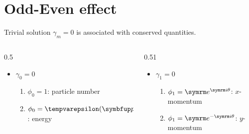\section{Odd-Even effect}

\begin{frame}{Trivial solution}
  \(\gamma_m = 0\) is associated with \alert{conserved quantities}.

  \begin{columns}
    \begin{column}{0.5\textwidth}
      \begin{itemize}
        \item \(\gamma_0 = 0\)
              \begin{enumerate}
                \item \(\phi_0 = 1\): particle number
                \item \(\phi_0 = \epsilon(\vv{p})\): energy
              \end{enumerate}
      \end{itemize}
    \end{column}
    \begin{column}{0.51\textwidth}
      \begin{itemize}
        \item \(\gamma_1 = 0\)
              \begin{enumerate}
                \item \(\phi_1 = \e^{\im \theta}\): \(x\)-momentum
                \item \(\phi_1 = \e^{-\im \theta}\): \(y\)-momentum
              \end{enumerate}
      \end{itemize}
    \end{column}
  \end{columns}
\end{frame}

